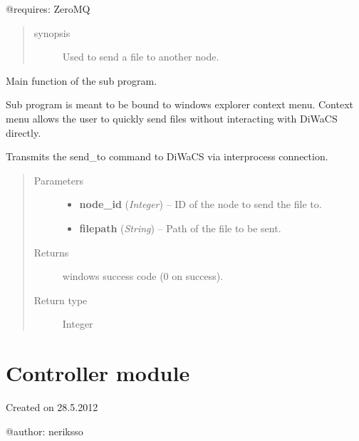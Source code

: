 \documentclass[letterpaper,10pt,english]{sphinxmanual}
\begin{document}
@requires: ZeroMQ
\begin{quote}\begin{description}
\item[{synopsis}] \leavevmode
Used to send a file to another node.

\end{description}\end{quote}

\begin{fulllineitems}
\label{api:send_file_to.main}
Main function of the sub program.

Sub program is meant to be bound to windows explorer context menu.
Context menu allows the user to quickly send files without interacting with DiWaCS directly.

Transmits the send\_to command to DiWaCS via interprocess connection.
\begin{quote}\begin{description}
\item[{Parameters}] \leavevmode\begin{itemize}
\item {} 
\textbf{node\_id} (\emph{Integer}) -- ID of the node to send the file to.

\item {} 
\textbf{filepath} (\emph{String}) -- Path of the file to be sent.

\end{itemize}

\item[{Returns}] \leavevmode
windows success code (0 on success).

\item[{Return type}] \leavevmode
Integer

\end{description}\end{quote}

\end{fulllineitems}



\section{Controller module}
\label{api:module-controller}\label{api:controller-module}
Created on 28.5.2012

@author: neriksso
\end{document}
